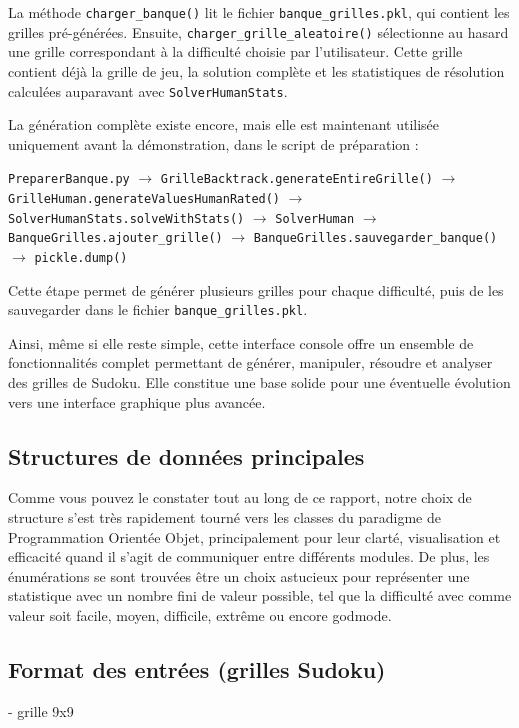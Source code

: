 \documentclass[a4paper]{article}
\begin{document}
La méthode \texttt{charger\_banque()} lit le fichier \texttt{banque\_grilles.pkl}, qui contient les grilles pré-générées. 
Ensuite, \texttt{charger\_grille\_aleatoire()} sélectionne au hasard une grille correspondant à la difficulté choisie par l'utilisateur. 
Cette grille contient déjà la grille de jeu, la solution complète et les statistiques de résolution calculées auparavant avec \texttt{SolverHumanStats}.

La génération complète existe encore, mais elle est maintenant utilisée uniquement avant la démonstration, dans le script de préparation :

\begin{center}
\texttt{PreparerBanque.py}
$\rightarrow$ \texttt{GrilleBacktrack.generateEntireGrille()}
$\rightarrow$ \texttt{GrilleHuman.generateValuesHumanRated()}
$\rightarrow$ \texttt{SolverHumanStats.solveWithStats()}
$\rightarrow$ \texttt{SolverHuman}
$\rightarrow$ \texttt{BanqueGrilles.ajouter\_grille()}
$\rightarrow$ \texttt{BanqueGrilles.sauvegarder\_banque()}
$\rightarrow$ \texttt{pickle.dump()}
\end{center}

Cette étape permet de générer plusieurs grilles pour chaque difficulté, puis de les sauvegarder dans le fichier \texttt{banque\_grilles.pkl}.

Ainsi, même si elle reste simple, cette interface console offre un ensemble de fonctionnalités complet permettant de générer, manipuler, résoudre et analyser des grilles de Sudoku. Elle constitue une base solide pour une éventuelle évolution vers une interface graphique plus avancée.

\subsection{Structures de données principales}

Comme vous pouvez le constater tout au long de ce rapport, notre choix de structure s'est très rapidement tourné vers les classes du paradigme de Programmation Orientée Objet, principalement pour leur clarté, visualisation et efficacité quand il s'agit de communiquer entre différents modules. De plus, les énumérations se sont trouvées être un choix astucieux pour représenter une statistique avec un nombre fini de valeur possible, tel que la difficulté avec comme valeur soit facile, moyen, difficile, extrême ou encore godmode.

\subsection{Format des entrées (grilles Sudoku)}
- grille 9x9
\end{document}
